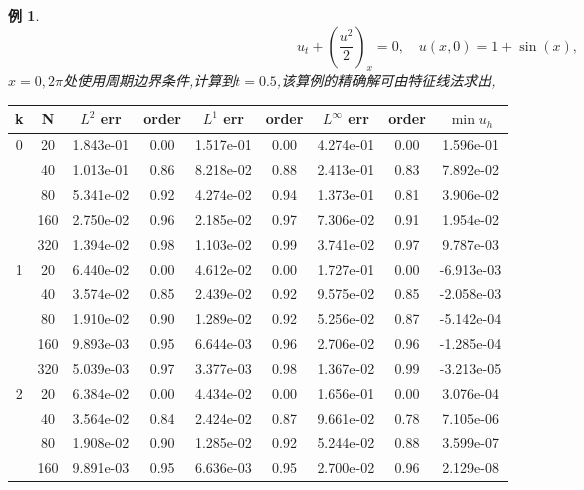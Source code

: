 \documentclass[a4paper, 11pt]{ctexart}
\numberwithin{equation}{section}
\numberwithin{figure}{section}
\newtheorem{example}{例}
\begin{document}
\begin{example}\label{ex:4}
\begin{equation}
  u_t+(\frac{u^2}{2})_x=0,\quad u(x,0)=1+\sin(x),
\end{equation}
$x=0,2\pi$处使用周期边界条件,计算到$t=0.5$,该算例的精确解可由特征线法求出,
\end{example}

\begin{table}[H]
  \centering
  \begin{tabular}{c|c|c|c|c|c|c|c|c} \toprule
 k  &  N &  $L^2$ err& order&$L^1$ err  &order & $L^\infty$ err&order& $\min u_h$ \\ \midrule
 \multirow{5}{*}{0}  &  20 & 1.843e-01 & 0.00 & 1.517e-01 & 0.00 & 4.274e-01 & 0.00 & 1.596e-01   \\
                     &  40 & 1.013e-01 & 0.86 & 8.218e-02 & 0.88 & 2.413e-01 & 0.83 & 7.892e-02   \\
                     &  80 & 5.341e-02 & 0.92 & 4.274e-02 & 0.94 & 1.373e-01 & 0.81 & 3.906e-02   \\
                     & 160 & 2.750e-02 & 0.96 & 2.185e-02 & 0.97 & 7.306e-02 & 0.91 & 1.954e-02   \\
                     & 320 & 1.394e-02 & 0.98 & 1.103e-02 & 0.99 & 3.741e-02 & 0.97 & 9.787e-03   \\ \midrule
 \multirow{5}{*}{1}  &  20 & 6.440e-02 & 0.00 & 4.612e-02 & 0.00 & 1.727e-01 & 0.00 & -6.913e-03  \\
                     &  40 & 3.574e-02 & 0.85 & 2.439e-02 & 0.92 & 9.575e-02 & 0.85 & -2.058e-03  \\
                     &  80 & 1.910e-02 & 0.90 & 1.289e-02 & 0.92 & 5.256e-02 & 0.87 & -5.142e-04  \\
                     & 160 & 9.893e-03 & 0.95 & 6.644e-03 & 0.96 & 2.706e-02 & 0.96 & -1.285e-04  \\
                     & 320 & 5.039e-03 & 0.97 & 3.377e-03 & 0.98 & 1.367e-02 & 0.99 & -3.213e-05  \\ \midrule
 \multirow{5}{*}{2}  &  20 & 6.384e-02 & 0.00 & 4.434e-02 & 0.00 & 1.656e-01 & 0.00 & 3.076e-04   \\
                     &  40 & 3.564e-02 & 0.84 & 2.424e-02 & 0.87 & 9.661e-02 & 0.78 & 7.105e-06   \\
                     &  80 & 1.908e-02 & 0.90 & 1.285e-02 & 0.92 & 5.244e-02 & 0.88 & 3.599e-07   \\
                     & 160 & 9.891e-03 & 0.95 & 6.636e-03 & 0.95 & 2.700e-02 & 0.96 & 2.129e-08   \\

\end{tabular}
\end{table}
\end{document}
